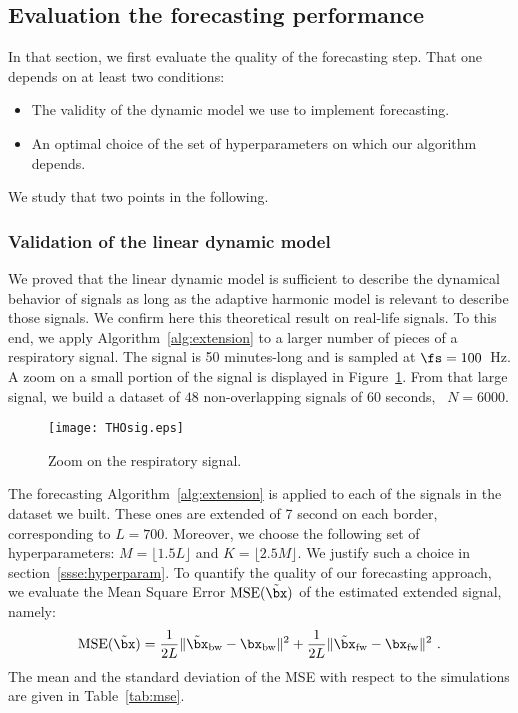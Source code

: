 \subsection{Evaluation the forecasting performance}
In that section, we first evaluate the quality of the forecasting step. That one depends on at least two conditions:
\begin{itemize}
\item The validity of the dynamic model we use to implement forecasting.
\item An optimal choice of the set of hyperparameters on which our algorithm depends. 
\end{itemize}
We study that two points in the following.

\subsubsection{Validation of the linear dynamic model}
\label{ssse:validation}
We proved that the linear dynamic model is sufficient to describe the dynamical behavior of signals as long as the adaptive harmonic model is relevant to describe those signals. We confirm here this theoretical result on real-life signals. To this end, we apply Algorithm~\ref{alg:extension} to a larger number of pieces of a respiratory signal. The signal is 50 minutes-long and is sampled at $\fs=100$~Hz. A zoom on a small portion of the signal is displayed in Figure~\ref{fig:tho}. From that large signal, we build a dataset of $48$ non-overlapping signals of 60 seconds, \ie~$N=6000$. 

\begin{figure}
\texttt{[image: THOsig.eps]}
\caption{Zoom on the respiratory signal.}
\label{fig:tho}
\end{figure}

The forecasting Algorithm~\ref{alg:extension} is applied to each of the signals in the dataset we built. These ones are extended of 7 second on each border, corresponding to $L =700$. Moreover, we choose the following set of hyperparameters: $M=\lfloor 1.5L\rfloor$ and $K=\lfloor2.5M\rfloor$. We justify such a choice in section~\ref{ssse:hyperparam}. To quantify the quality of our forecasting approach, we evaluate the Mean Square Error $\mathrm{MSE}(\tilde\bx)$ of the estimated extended signal, namely:
\[
\mathrm{MSE}(\tilde\bx) = \dfrac1{2L}\|\tilde\bx_{\rm bw} -\bx_{\rm bw}\|^2 + \dfrac1{2L}\|\tilde\bx_{\rm fw} -\bx_{\rm fw}\|^2\ .
\]
The mean and the standard deviation of the MSE with respect to the simulations are given in Table~\ref{tab:mse}. 

